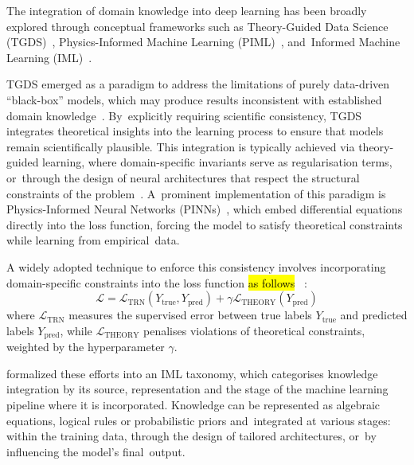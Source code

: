 \documentclass[applsci,article,accept,moreauthors,pdftex]{Definitions/mdpi}
\begin{document}
The integration of domain knowledge into deep learning has been broadly explored through conceptual frameworks such as Theory-Guided Data Science (TGDS)~\citep{karpatne2017theory}, Physics-Informed Machine Learning (PIML)~\citep{karniadakis2021physics}, and~Informed Machine Learning (IML)~\citep{vonrueden2021informed}. 

TGDS emerged as a paradigm to address the limitations of purely data-driven ``black-box'' models, which may produce results inconsistent with established domain knowledge~\citep{karpatne2017theory}. By~explicitly requiring scientific consistency, TGDS integrates theoretical insights into the learning process to ensure that models remain scientifically plausible. This integration is typically achieved via theory-guided learning, where domain-specific invariants serve as {regularisation} terms, or~through the design of neural architectures that respect the structural constraints of the problem~\citep{karpatne2017theory, jia2021physics}. A~prominent implementation of this paradigm is Physics-Informed Neural Networks (PINNs)~\citep{raissi2019physics, karniadakis2021physics}, which embed differential equations directly into the loss function, forcing the model to satisfy theoretical constraints while learning from empirical~data. 

A widely adopted technique to enforce this consistency involves incorporating domain-specific constraints into the loss function \hl{as follows}%
~\citep{karpatne2017theory, willard2022integrating}:
\begin{equation} \label{eq_theory_loss}
\mathcal{L} = \mathcal{L}_{\text{TRN}}(Y_{\text{true}}, Y_{\text{pred}}) + \gamma \mathcal{L}_{\text{THEORY}}(Y_{\text{pred}})
\end{equation}
where $\mathcal{L}_{\text{TRN}}$ measures the supervised error between true labels $Y_{\text{true}}$ and predicted labels $Y_{\text{pred}}$, while $\mathcal{L}_{\text{THEORY}}$ {penalises} violations of theoretical constraints, weighted by the hyperparameter $\gamma$. 

\citet{vonrueden2021informed} formalized these efforts into an IML taxonomy, which {categorises} knowledge integration by its source, representation and the stage of the machine learning pipeline where it is incorporated. Knowledge can be represented as algebraic equations, logical rules or probabilistic priors and~integrated at various stages: within the training data, through the design of tailored architectures, or~by influencing the model's final~output. 
\end{document}
